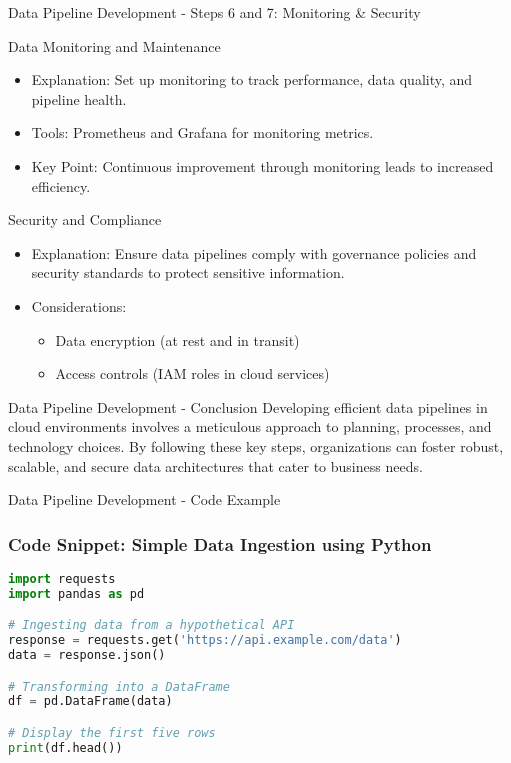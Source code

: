 \documentclass[aspectratio=169]{beamer}
\begin{document}
\begin{frame}[fragile]{Data Pipeline Development - Steps 6 and 7: Monitoring & Security}
    \begin{block}{Data Monitoring and Maintenance}
        \begin{itemize}
            \item Explanation: Set up monitoring to track performance, data quality, and pipeline health. 
            \item Tools: Prometheus and Grafana for monitoring metrics.
            \item Key Point: Continuous improvement through monitoring leads to increased efficiency.
        \end{itemize}
    \end{block}
    
    \begin{block}{Security and Compliance}
        \begin{itemize}
            \item Explanation: Ensure data pipelines comply with governance policies and security standards to protect sensitive information.
            \item Considerations:
                \begin{itemize}
                    \item Data encryption (at rest and in transit)
                    \item Access controls (IAM roles in cloud services)
                \end{itemize}
        \end{itemize}
    \end{block}
\end{frame}

\begin{frame}[fragile]{Data Pipeline Development - Conclusion}
    Developing efficient data pipelines in cloud environments involves a meticulous approach to planning, processes, and technology choices. By following these key steps, organizations can foster robust, scalable, and secure data architectures that cater to business needs.
\end{frame}

\begin{frame}[fragile]{Data Pipeline Development - Code Example}
    \frametitle{Code Snippet: Simple Data Ingestion using Python}
    \begin{lstlisting}[language=Python]
import requests
import pandas as pd

# Ingesting data from a hypothetical API
response = requests.get('https://api.example.com/data')
data = response.json()

# Transforming into a DataFrame
df = pd.DataFrame(data)

# Display the first five rows
print(df.head())
    \end{lstlisting}
\end{frame}
\end{document}
